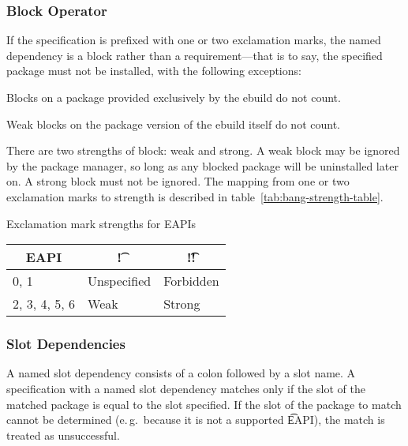\subsubsection{Block Operator}

If the specification is prefixed with one or two exclamation marks, the named dependency is a block
rather than a requirement---that is to say, the specified package must not be installed, with the
following exceptions:

\begin{compactitem}
\item Blocks on a package provided exclusively by the ebuild do not count.
\item Weak blocks on the package version of the ebuild itself do not count.
\end{compactitem}

 There are two strengths of block: weak and strong. A weak block may be
ignored by the package manager, so long as any blocked package will be uninstalled later on. A
strong block must not be ignored. The mapping from one or two exclamation marks to strength is
described in table~\ref{tab:bang-strength-table}.

\begin{centertable}{Exclamation mark strengths for EAPIs}
    \label{tab:bang-strength-table}
    \begin{tabular}{lll}
      \toprule
      \multicolumn{1}{c}{\textbf{EAPI}} &
      \multicolumn{1}{c}{\textbf{\t{!}}} &
      \multicolumn{1}{c}{\textbf{\t{!!}}} \\
      \midrule
      0, 1              & Unspecified & Forbidden \\
      2, 3, 4, 5, 6     & Weak        & Strong    \\
      \bottomrule
    \end{tabular}
\end{centertable}

\subsubsection{Slot Dependencies}
\label{sec:slot-dep}

 A named slot dependency consists of a colon followed by a slot name. A
specification with a named slot dependency matches only if the slot of the matched package is equal
to the slot specified. If the slot of the package to match cannot be determined (e.\,g.\ because it
is not a supported \t{EAPI}), the match is treated as unsuccessful.

